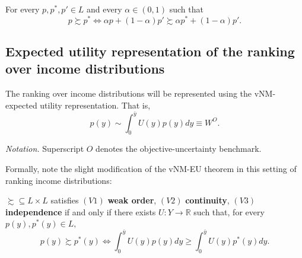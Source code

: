 \documentclass[Chp3.tex]{subfiles}
\begin{document}
\begin{ax.V}[Independence]
For every $p,p^*,p' \in L$ and every $\alpha \in (0,1)$ such that 
$$ p \succsim p^* \iff \alpha p + (1-\alpha)p' \succsim \alpha p^* + (1-\alpha)p'. $$
\end{ax.V}

\subsection{Expected utility representation of the ranking over income distributions}

\par The ranking over income distributions will be represented using the vNM-expected utility representation. That is,
$$ p(y) \sim \int_{0}^{\bar{y}} U(y) p(y) dy \equiv W^{O}. $$

\par \textit{Notation.} Superscript $O$ denotes the objective-uncertainty benchmark.

\par Formally, note the slight modification of the vNM-EU theorem in this setting of ranking income distributions:

\begin{tm}
$\succsim \subseteq L \times L$ satisfies $(V1)$ \textbf{weak order}, $(V2)$ \textbf{continuity}, $(V3)$ \textbf{independence} if and only if there exists $U: Y \to \mathbb{R}$ such that, for every $p(y), p^*(y) \in L,$
$$ p(y) \succsim p^*(y) \iff \int_{0}^{\bar{y}} U(y) p(y) dy \geq \int_{0}^{\bar{y}} U(y) p^*(y) dy. $$
\end{tm}
\end{document}
